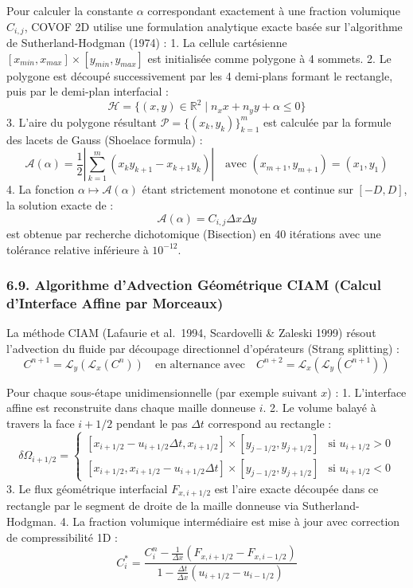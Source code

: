 \documentclass[
  french,
]{article}
\begin{document}
Pour calculer la constante \(\alpha\) correspondant exactement à une
fraction volumique \(C_{i, j}\), COVOF 2D utilise une formulation
analytique exacte basée sur l'algorithme de Sutherland-Hodgman (1974) :
1. La cellule cartésienne
\([x_{min}, x_{max}] \times [y_{min}, y_{max}]\) est initialisée comme
polygone à 4 sommets. 2. Le polygone est découpé successivement par les
4 demi-plans formant le rectangle, puis par le demi-plan interfacial :
\[\mathcal{H} = \{ (x, y) \in \mathbb{R}^2 \mid n_x x + n_y y + \alpha \le 0 \}\]
3. L'aire du polygone résultant
\(\mathcal{P} = \{ (x_k, y_k) \}_{k=1}^m\) est calculée par la formule
des lacets de Gauss (Shoelace formula) :
\[\mathcal{A}(\alpha) = \frac{1}{2} \left| \sum_{k=1}^m (x_k y_{k+1} - x_{k+1} y_k) \right| \quad \text{avec } (x_{m+1}, y_{m+1}) = (x_1, y_1)\]
4. La fonction \(\alpha \mapsto \mathcal{A}(\alpha)\) étant strictement
monotone et continue sur \([-D, D]\), la solution exacte de :
\[\mathcal{A}(\alpha) = C_{i, j} \Delta x \Delta y\] est obtenue par
recherche dichotomique (Bisection) en 40 itérations avec une tolérance
relative inférieure à \(10^{-12}\).

\subsubsection{6.9. Algorithme d'Advection Géométrique CIAM (Calcul
d'Interface Affine par
Morceaux)}\label{algorithme-dadvection-guxe9omuxe9trique-ciam-calcul-dinterface-affine-par-morceaux}

La méthode CIAM (Lafaurie et al.~1994, Scardovelli \& Zaleski 1999)
résout l'advection du fluide par découpage directionnel d'opérateurs
(Strang splitting) :
\[C^{n+1} = \mathcal{L}_y \left( \mathcal{L}_x (C^n) \right) \quad \text{en alternance avec} \quad C^{n+2} = \mathcal{L}_x \left( \mathcal{L}_y (C^{n+1}) \right)\]

Pour chaque sous-étape unidimensionnelle (par exemple suivant \(x\)) :
1. L'interface affine est reconstruite dans chaque maille donneuse
\(i\). 2. Le volume balayé à travers la face \(i+1/2\) pendant le pas
\(\Delta t\) correspond au rectangle :
\[\delta \Omega_{i+1/2} = \begin{cases} [x_{i+1/2} - u_{i+1/2}\Delta t, x_{i+1/2}] \times [y_{j-1/2}, y_{j+1/2}] & \text{si } u_{i+1/2} > 0 \\ [x_{i+1/2}, x_{i+1/2} - u_{i+1/2}\Delta t] \times [y_{j-1/2}, y_{j+1/2}] & \text{si } u_{i+1/2} < 0 \end{cases}\]
3. Le flux géométrique interfacial \(F_{x, i+1/2}\) est l'aire exacte
découpée dans ce rectangle par le segment de droite de la maille
donneuse via Sutherland-Hodgman. 4. La fraction volumique intermédiaire
est mise à jour avec correction de compressibilité 1D :
\[C_i^* = \frac{C_i^n - \frac{1}{\Delta x} (F_{x, i+1/2} - F_{x, i-1/2})}{1 - \frac{\Delta t}{\Delta x} (u_{i+1/2} - u_{i-1/2})}\]
\end{document}
